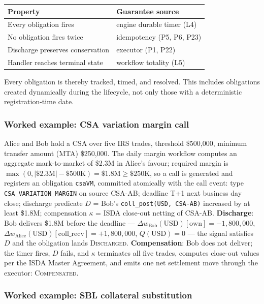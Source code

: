 \begin{center}
\small
\begin{tabular}{l l}
\toprule
\textbf{Property} & \textbf{Guarantee source} \\
\midrule
Every obligation fires & engine durable timer (L4) \\
No obligation fires twice & idempotency (P5, P6, P23) \\
Discharge preserves conservation & executor (P1, P22) \\
Handler reaches terminal state & workflow totality (L5) \\
\bottomrule
\end{tabular}
\end{center}

\noindent Every obligation is thereby tracked, timed, and resolved. This includes obligations created dynamically during the lifecycle, not only those with a deterministic registration-time date.

\subsubsection{Worked example: CSA variation margin call}
\label{sec:obligation-example-csa}

Alice and Bob hold a CSA over five IRS trades, threshold \$500{,}000, minimum transfer amount (MTA) \$250{,}000. The daily margin workflow computes an aggregate mark-to-market of \$2.3M in Alice's favour; required margin is $\max(0, |\$2.3\text{M}| - \$500\text{K}) = \$1.8\text{M} \geq \$250\text{K}$, so a call is generated and registers an obligation \texttt{csaVM}, committed atomically with the call event: type \texttt{CSA\_VARIATION\_MARGIN} on source CSA-AB; deadline T+1 next business day close; discharge predicate $D$ = Bob's \texttt{coll\_post(USD, CSA-AB)} increased by at least \$1.8M; compensation $\kappa$ = ISDA close-out netting of CSA-AB. \textbf{Discharge}: Bob delivers \$1.8M before the deadline --- $\Delta w_{\mathrm{Bob}}(\mathrm{USD})[\mathrm{own}] = -1{,}800{,}000$, $\Delta w_{\mathrm{Alice}}(\mathrm{USD})[\mathrm{coll\_recv}] = +1{,}800{,}000$, $Q(\mathrm{USD})=0$ --- the signal satisfies $D$ and the obligation lands \textsc{Discharged}. \textbf{Compensation}: Bob does not deliver; the timer fires, $D$ fails, and $\kappa$ terminates all five trades, computes close-out values per the ISDA Master Agreement, and emits one net settlement move through the executor: \textsc{Compensated}.

\subsubsection{Worked example: SBL collateral substitution}
\label{sec:obligation-example-sbl}

